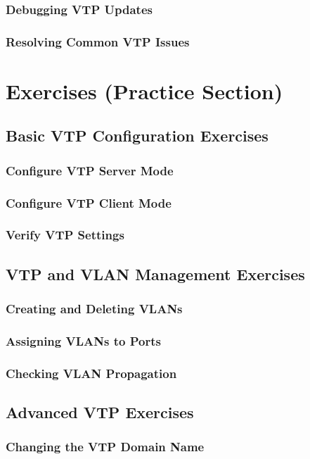 \documentclass{book}
\begin{document}
\subsection{Debugging VTP Updates}
\subsection{Resolving Common VTP Issues}

\chapter{Exercises (Practice Section)}
\section{Basic VTP Configuration Exercises}
\subsection{Configure VTP Server Mode}
\subsection{Configure VTP Client Mode}
\subsection{Verify VTP Settings}

\section{VTP and VLAN Management Exercises}
\subsection{Creating and Deleting VLANs}
\subsection{Assigning VLANs to Ports}
\subsection{Checking VLAN Propagation}

\section{Advanced VTP Exercises}
\subsection{Changing the VTP Domain Name}
\end{document}
